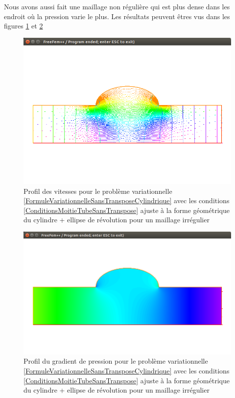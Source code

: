 \documentclass[11pt,a4paper]{article}
\numberwithin{equation}{subsection}
\numberwithin{figure}{subsection}
\begin{document}
Nous avons aussi fait une maillage non régulière qui est plus dense dans les endroit où la pression varie le plus. Les résultats peuvent êtres vus dans les figures \ref{StokesClassiqueVitessesCylindreEllipseIrregulier} et \ref{StokesClassiquePressionCylindreEllipseIrregulier}

\clearpage

\begin{figure}[h]
\centering
\includegraphics[scale=0.4]{StokesClassiqueVitessesCylindreEllipseIrregulier.png}
\caption{Profil des vitesses pour le problème variationnelle \ref{FormuleVariationnelleSansTransposeCylindrique} avec les conditions \ref{ConditionsMoitieTubeSansTranspose} ajuste à la forme géométrique du cylindre + ellipse de révolution pour un maillage irrégulier}
\label{StokesClassiqueVitessesCylindreEllipseIrregulier}
\end{figure}

\begin{figure}[h]
\centering
\includegraphics[scale=0.4]{StokesClassiquePressionCylindreEllipseIrregulier.png}
\caption{Profil du gradient de pression pour le problème variationnelle \ref{FormuleVariationnelleSansTransposeCylindrique} avec les conditions \ref{ConditionsMoitieTubeSansTranspose} ajuste à la forme géométrique du cylindre + ellipse de révolution pour un maillage irrégulier}
\label{StokesClassiquePressionCylindreEllipseIrregulier}
\end{figure}
\end{document}
